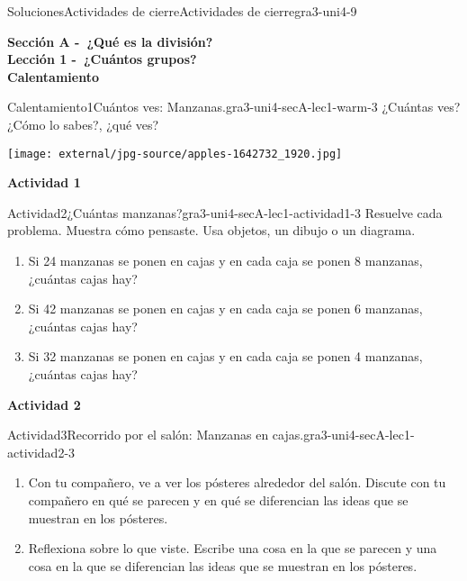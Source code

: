 \documentclass[twoside,10pt,]{article}
\begin{document}
\begin{solutions-section}{Soluciones}{Actividades de cierre}{}{Actividades de cierre}{}{}{gra3-uni4-9}
\par\medskip
\noindent\textbf{\large{}\space\textperiodcentered\space{}Sección A -~¿Qué es la división?\\
\space\textperiodcentered\space{}Lección 1 -~¿Cuántos grupos?\\
\space\textperiodcentered\space{}Calentamiento}
\begin{explorationsolution}{Calentamiento}{1}{Cuántos ves: Manzanas.}{gra3-uni4-secA-lec1-warm-3}%
¿Cuántas ves? ¿Cómo lo sabes?, ¿qué ves?%
\begin{image}{0}{1}{0}{}%
\texttt{[image: external/jpg-source/apples-1642732\_1920.jpg]}
\end{image}%
\end{explorationsolution}%
\par\medskip
\noindent\textbf{\large{}\space\textperiodcentered\space{}Actividad 1}
\begin{activitysolution}{Actividad}{2}{¿Cuántas manzanas?}{gra3-uni4-secA-lec1-actividad1-3}%
Resuelve cada problema. Muestra cómo pensaste. Usa objetos, un dibujo o un diagrama.%
\par
%
\begin{enumerate}
\item{}Si 24 manzanas se ponen en cajas y en cada caja se ponen 8 manzanas, ¿cuántas cajas hay?%
\item{}Si 42 manzanas se ponen en cajas y en cada caja se ponen 6 manzanas, ¿cuántas cajas hay?%
\item{}Si 32 manzanas se ponen en cajas y en cada caja se ponen 4 manzanas, ¿cuántas cajas hay?%
\end{enumerate}
%
\end{activitysolution}%
\par\medskip
\noindent\textbf{\large{}\space\textperiodcentered\space{}Actividad 2}
\begin{activitysolution}{Actividad}{3}{Recorrido por el salón: Manzanas en cajas.}{gra3-uni4-secA-lec1-actividad2-3}%
%
\begin{enumerate}
\item{}Con tu compañero, ve a ver los pósteres alrededor del salón. Discute con tu compañero en qué se parecen y en qué se diferencian las ideas que se muestran en los pósteres.%
\item{}Reflexiona sobre lo que viste. Escribe una cosa en la que se parecen y una cosa en la que se diferencian las ideas que se muestran en los pósteres.%

\end{enumerate}
\end{activitysolution}
\end{solutions-section}
\end{document}
